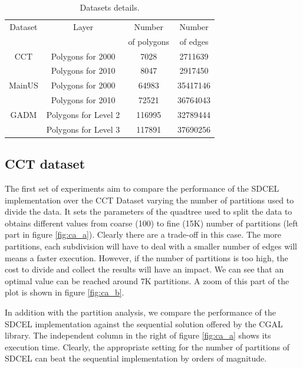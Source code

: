 \begin{table}[!ht]
    \caption{Datasets details.}
    \label{tab:datasets}
    \begin{tabular}{c c c c}
        \toprule
        Dataset & Layer & Number        & Number    \\
                &       & of polygons   & of edges  \\
        \midrule
        CCT   & Polygons for 2000 & 7028 & 2711639          \\
              & Polygons for 2010 & 8047 & 2917450          \\
        MainUS& Polygons for 2000 & 64983 & 35417146        \\
              & Polygons for 2010 & 72521 & 36764043        \\
        GADM  & Polygons for Level 2 & 116995 & 32789444    \\
              & Polygons for Level 3 & 117891 & 37690256    \\
        \bottomrule
    \end{tabular}
\end{table}

\subsection{CCT dataset}

The first set of experiments aim to compare the performance of the SDCEL implementation over the CCT Dataset varying the number of partitions used to divide the data. It sets the parameters of the quadtree used to split the data to obtains different values from coarse (100) to fine (15K) number of partitions (left part in figure \ref{fig:ca_a}).  Clearly there are a trade-off in this case.  The more partitions, each subdivision will have to deal with a smaller number of edges will means a faster execution.  However, if the number of partitions is too high, the cost to divide and collect the results will have an impact.  We can see that an optimal value can be reached around 7K partitions.  A zoom of this part of the plot is shown in figure \ref{fig:ca_b}.

In addition with the partition analysis, we compare the performance of the SDCEL implementation against the sequential solution offered by the CGAL library.  The independent column in the right of figure \ref{fig:ca_a} shows its execution time.  Clearly, the appropriate setting for the number of partitions of SDCEL can beat the sequential implementation by orders of magnitude.

